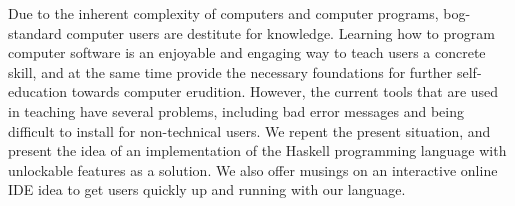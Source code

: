 Due to the inherent complexity of computers and computer programs, bog-standard
computer users are destitute for knowledge. Learning how to program computer
software is an enjoyable and engaging way to teach users a concrete skill, and
at the same time provide the necessary foundations for further self-education
towards computer erudition. However, the current tools that are used in
teaching have several problems, including bad error messages and being
difficult to install for non-technical users. We repent the present situation,
and present the idea of an implementation of the Haskell programming language
with unlockable features as a solution. We also offer musings on an interactive
online IDE idea to get users quickly up and running with our language.
